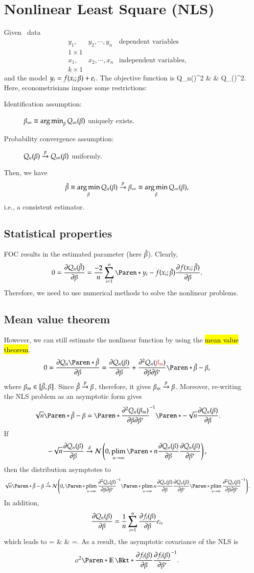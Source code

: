 \documentclass{Theme}
\begin{document}
\section{Nonlinear Least Square (NLS)}
Given \iid\ data 
\[
  \begin{array}{LLL}
    y_1, & y_2,\cdots,y_n & \text{dependent variables} \\
    1\times1 & & \\
    x_1, & x_2,\cdots,x_n & \text{independent variables,} \\
    k\times1 & &
\end{array}
\]
and the model $y_i=f(x_i;\beta)+e_i$. The objective function is 
\barc
Q_n(\be)\equiv\frn\sumn{}^2 & \pto & 
Q_\infty(\be)\equiv{}^2.
\earc
Here, econometrisians impose some restrictions:
\begin{description}
  \item[Identification assumption:]
    $\beta_\infty\equiv\operatorname*{arg\,min}_\beta Q_\infty(\beta)$ uniquely exists.
  \item[Probability convergence assumption:]
    $Q_n(\beta)\stackrel{p}{\to} Q_\infty(\beta)$ uniformly.
\end{description}
Then, we have 
\[
  \hat{\beta}\equiv\operatorname*{arg\,min}_\beta Q_n(\beta)\stackrel{p}{\to} 
  \beta_\infty\equiv\operatorname*{arg\,min}_\beta Q_\infty(\beta),
\]
i.e., a consistent estimator.

\subsection{Statistical properties}
FOC results in the estimated parameter (here $\hat{\beta}$). 
Clearly,
\[
  0=\pdv{Q_n(\hat{\beta})}{\beta}
  =\frac{-2}{n}\sumn\br{y_i-f(x_i;\hat{\beta})}\pdv{f(x_i;\hat{\beta})}{\beta}.
\]
Therefore, we need to use numerical methods to solve the nonlinear problems.

\subsection{Mean value theorem}
However, we can still estimate the nonlinear function by using the \hl{mean value theorem}.
\[
  0=\pdv{Q_n\br{\hat{\beta}}}{\beta}=\pdv{Q_n(\beta)}{\beta}
  +\ppdv{Q_n(\hl{\beta_m})}{\beta}{\beta'}\br{\hat{\be}-\beta},
\]
where $\beta_m\in[\hat{\beta},\beta]$. Since $\hat{\beta}\stackrel{p}{\to}\beta$,
therefore, it gives $\beta_m\stackrel{p}{\to}\beta$.
Moreover, re-writing the NLS problem as an asymptotic form gives 
\[
  \sqrt{n}\br{\hat{\be}-\be}=\br{\ppdv{Q_n(\be_m)}{\beta}{\beta'}}\inv 
  \br{-\sqrt{n}\pdv{Q_n(\be)}{\be}}.
\]
If 
\[
  -\sqrt{n}\pdv{Q_n(\be)}{\be}\dto\nor{0,\plinf\br{n\pdv{Q_n(\be)}{\beta}\pdv{Q_n(\be)}{\be'}}},
\]
then the distribution asymptotes to 
\[
  \sqrt{n}\br{\hat{\beta}-\beta}\dto 
  \nor{0,\br{\plinf\ppdv{Q_n(\be)}{\beta}{\beta'}}\inv\br{\plinf n\pdv{Q_n(\be)}{\be}\pdv{Q_n(\be)}{\be'}}\br{\plinf\ppdv{Q_n(\be)}{\beta}{\beta'}}\inv}.
\]
In addition,
\[
  \frac{\partial Q_n(\beta)}{\partial \beta}=\frac{1}{n}\sum_{i=1}^n\frac{\partial f_i(\beta)}{\partial \beta}e_i,
\]
which leads to 
\barc
\plinf{}
=
& \tand & 
\plinf{}
=.
\earc 
As a result, the asymptotic covariance of the NLS is 
\[
  \si^2\br{\E{\pdv{f_i(\be)}{\be}\pdv{f_i(\be)}{\be'}}}\inv.
\]
\end{document}
